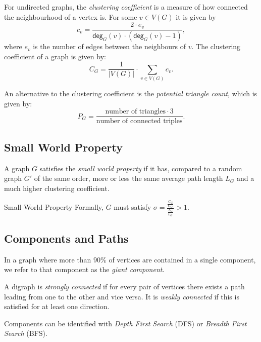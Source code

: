 \documentclass[english]{panikzettel}
\renewcommand\deg{\textsf{deg}}
\begin{document}
For undirected graphs, the \textit{clustering coefficient} is a measure of how connected the neighbourhood of a vertex is.
For some $v \in V(G)$ it is given by $$c_v = \frac{2 \cdot e_v}{\deg_G(v)\cdot(\deg_G(v)-1)},$$
where $e_v$ is the number of edges between the neighbours of $v$.
The clustering coefficient of a graph is given by: $$C_G = \frac{1}{|V(G)|} \cdot \sum_{v \in V(G)} c_v.$$

An alternative to the clustering coefficient is the \textit{potential triangle count}, which is given by: $$P_G = \frac{\text{number of triangles} \cdot 3}{\text{number of connected triples}}.$$

\subsection{Small World Property} \label{sec:small-world}

\begin{halfboxl}
    A graph $G$ satisfies the \textit{small world property} if it has, compared to a random graph $G'$ of the same order, more or less the same average path length $L_G$ and a much higher clustering coefficient.
\end{halfboxl}%
\begin{halfboxr}
    \vspace{-\baselineskip}
     \begin{defi}{Small World Property}
        Formally, $G$ must satisfy $\sigma = \frac{\frac{C_G}{C_{G'}}}{\frac{L_G}{L_{G'}}} > 1$.
    \end{defi}
\end{halfboxr}

\subsection{Components and Paths}

In a graph where more than $90\%$ of vertices are contained in a single component, we refer to that component as the \textit{giant component}.

A digraph is \textit{strongly connected} if for every pair of vertices there exists a path leading from one to the other and vice versa.
It is \textit{weakly connected} if this is satisfied for at least one direction.

Components can be identified with \emph{Depth First Search} (DFS) or \emph{Breadth First Search} (BFS).
\end{document}
